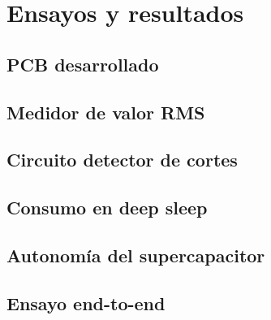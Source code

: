 
\chapter{Ensayos y resultados} %

\label{Chapter4} %


\section{PCB desarrollado}
\label{sec:pruebasHW}

\section{Medidor de valor RMS}

\section{Circuito detector de cortes}

\section{Consumo en deep sleep}

\section{Autonom\'{i}a del supercapacitor}

\section{Ensayo end-to-end}
